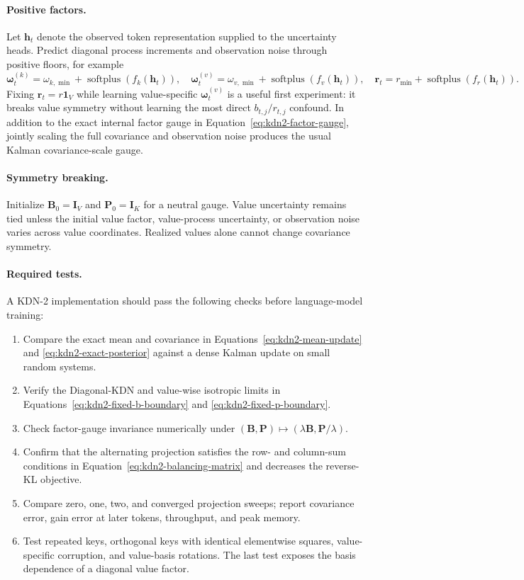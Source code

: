 \documentclass[11pt]{article}
\newcommand{\ve}[1]{\boldsymbol{#1}}
\begin{document}
\paragraph{Positive factors.}
Let $\ve{h}_t$ denote the observed token representation supplied to the uncertainty heads.
Predict diagonal process increments and observation noise through positive floors, for example
\begin{equation}
  \ve{\omega}^{(k)}_t
  =\omega_{k,\min}+\operatorname{softplus}(f_k(\ve{h}_t)),
  \quad
  \ve{\omega}^{(v)}_t
  =\omega_{v,\min}+\operatorname{softplus}(f_v(\ve{h}_t)),
  \quad
  \ve{r}_t=r_{\min}+\operatorname{softplus}(f_r(\ve{h}_t)).
  \label{eq:kdn2-positive-parameterization}
\end{equation}
Fixing $\ve{r}_t=r\ve{1}_V$ while learning value-specific
$\ve{\omega}^{(v)}_t$ is a useful first experiment: it breaks value symmetry without learning the
most direct $b_{t,j}/r_{t,j}$ confound.  In addition to the exact internal factor gauge in
Equation~\eqref{eq:kdn2-factor-gauge}, jointly scaling the full covariance and observation noise
produces the usual Kalman covariance-scale gauge.

\paragraph{Symmetry breaking.}
Initialize $\ve{B}_0=\ve{I}_V$ and $\ve{P}_0=\ve{I}_K$ for a neutral gauge.  Value uncertainty
remains tied unless the initial value factor, value-process uncertainty, or observation noise
varies across value coordinates.  Realized values alone cannot change covariance symmetry.

\paragraph{Required tests.}
A KDN-2 implementation should pass the following checks before language-model training:
\begin{enumerate}
  \item Compare the exact mean and covariance in
    Equations~\eqref{eq:kdn2-mean-update} and \eqref{eq:kdn2-exact-posterior} against a dense
    Kalman update on small random systems.
  \item Verify the Diagonal-KDN and value-wise isotropic limits in
    Equations~\eqref{eq:kdn2-fixed-b-boundary} and \eqref{eq:kdn2-fixed-p-boundary}.
  \item Check factor-gauge invariance numerically under
    $(\ve{B},\ve{P})\mapsto(\lambda\ve{B},\ve{P}/\lambda)$.
  \item Confirm that the alternating projection satisfies the row- and column-sum conditions in
    Equation~\eqref{eq:kdn2-balancing-matrix} and decreases the reverse-KL objective.
  \item Compare zero, one, two, and converged projection sweeps; report covariance error, gain
    error at later tokens, throughput, and peak memory.
  \item Test repeated keys, orthogonal keys with identical elementwise squares, value-specific
    corruption, and value-basis rotations.  The last test exposes the basis dependence of a
    diagonal value factor.
\end{enumerate}
\end{document}
